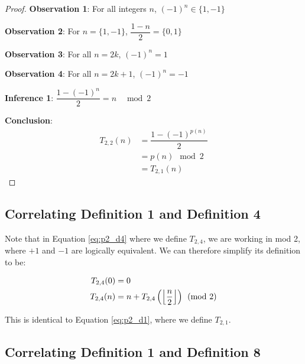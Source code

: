 \documentclass[conference]{IEEEtran}
\begin{document}
\begin{proof}
\par\noindent\par
    \textbf{Observation 1}: For all integers $n$, $(-1)^n \in \{1, -1\}$

    \textbf{Observation 2}: For $n = \{1, -1\}$, $\dfrac{1 - n}{2} = \{0, 1\}$

    \textbf{Observation 3}: For all $n = 2k$, $(-1)^n = 1$

    \textbf{Observation 4}: For all $n = 2k + 1$, $(-1)^n = -1$

    \textbf{Inference 1}: $\dfrac{1 - (-1)^n}{2} = n \;\; \mod{2}$

    \textbf{Conclusion}:
    \vspace{-1.5em}
    \begin{equation}\begin{aligned}
        T_{2,2}(n) &= \dfrac{1 - (-1)^{p(n)}}{2}\\
                   &= p(n) \mod{2}\\
                   &= T_{2,1}(n)
    \end{aligned}
    \end{equation}\vspace{-1.5em}
\end{proof}

\subsection{Correlating Definition 1 and Definition 4}

Note that in Equation \ref{eq:p2_d4} where we define $T_{2,4}$, we are working in mod 2, where $+1$ and $-1$ are logically equivalent. We can therefore simplify its definition to be:

\begin{equation}
    \label{eq:p2d04s}
    \begin{aligned}
T_{2,4}(0) &= 0 \\
T_{2,4}(n) &= n + T_{2,4}\left(\floor{\dfrac{n}{2}}\right) \pmod{2}
    \end{aligned}
\end{equation}

This is identical to Equation \ref{eq:p2_d1}, where we define $T_{2,1}$.

\subsection{Correlating Definition 1 and Definition 8}
\end{document}
